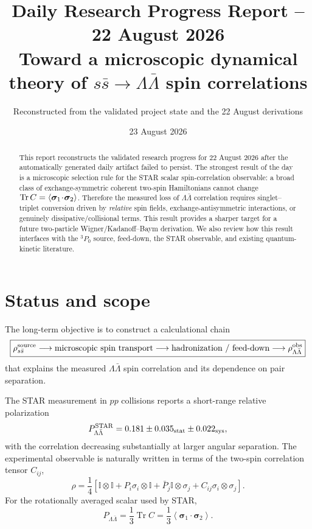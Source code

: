 \documentclass[11pt]{article}
\title{\textbf{Daily Research Progress Report -- 22 August 2026}\\
Toward a microscopic dynamical theory of $s\bar s\to\Lambda\bar\Lambda$ spin correlations}
\author{Reconstructed from the validated project state and the 22 August derivations}
\date{23 August 2026}
\newcommand{\ssb}{s\bar s}
\newcommand{\LLb}{\Lambda\bar\Lambda}
\newcommand{\Id}{\mathbb I}
\newcommand{\Trc}{\operatorname{Tr}}
\begin{document}
\maketitle

\begin{abstract}
This report reconstructs the validated research progress for 22 August 2026 after the automatically
generated daily artifact failed to persist. The strongest result of the day is a microscopic
selection rule for the STAR scalar spin-correlation observable:
a broad class of exchange-symmetric coherent two-spin Hamiltonians cannot change
$\Tr C=\langle\bm\sigma_1\!\cdot\!\bm\sigma_2\rangle$.
Therefore the measured loss of $\Lambda\bar\Lambda$ correlation requires
singlet--triplet conversion driven by \emph{relative} spin fields, exchange-antisymmetric interactions,
or genuinely dissipative/collisional terms. This result provides a sharper target for a future
two-particle Wigner/Kadanoff--Baym derivation. We also review how this result interfaces with
the ${}^3P_0$ source, feed-down, the STAR observable, and existing quantum-kinetic literature.
\end{abstract}

\section{Status and scope}

The long-term objective is to construct a calculational chain
\begin{equation}
\boxed{
\rho_{\ssb}^{\rm source}
\longrightarrow
\text{microscopic spin transport}
\longrightarrow
\text{hadronization / feed-down}
\longrightarrow
\rho_{\LLb}^{\rm obs}
}
\end{equation}
that explains the measured $\LLb$ spin correlation and its dependence on pair separation.

The STAR measurement in $pp$ collisions reports a short-range relative polarization
\begin{equation}
P_{\LLb}^{\rm STAR}
=
0.181\pm0.035_{\rm stat}\pm0.022_{\rm sys},
\label{eq:starvalue}
\end{equation}
with the correlation decreasing substantially at larger angular separation.
The experimental observable is naturally written in terms of the two-spin correlation tensor
$C_{ij}$,
\begin{equation}
\rho
=
\frac14
\left[
\Id\otimes\Id
+P_i\sigma_i\otimes\Id
+\bar P_j\Id\otimes\sigma_j
+C_{ij}\sigma_i\otimes\sigma_j
\right].
\label{eq:rho}
\end{equation}
For the rotationally averaged scalar used by STAR,
\begin{equation}
\boxed{
P_{\LLb}
=
\frac13\Trc C
=
\frac13
\left\langle
\bm\sigma_1\cdot\bm\sigma_2
\right\rangle .
}
\label{eq:scalar}
\end{equation}
\end{document}
